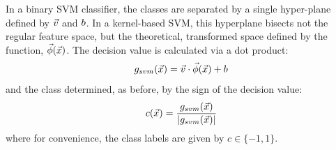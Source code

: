 In a binary SVM classifier, the classes are separated by a single hyper-plane
defined by $\vec v$ and $b$.
In a kernel-based SVM, this hyperplane bisects not the regular feature
space, but the theoretical, transformed space defined by the function,
$\vec\phi(\vec {x})$.
The decision value is calculated via a dot product:
\begin{equation}
	g_{svm}(\vec {x})=\vec v \cdot \vec\phi(\vec {x}) + b
	\label{decision_function0}
\end{equation}
and the class determined, as before, by the sign of the decision value:
\begin{equation}
	c(\vec {x}) = \frac{g_{svm}(\vec {x})}{|g_{svm}(\vec {x})|}
	\label{class_value}
\end{equation}
where for convenience, the class labels are given by $c \in \lbrace -1, 1 \rbrace$.

